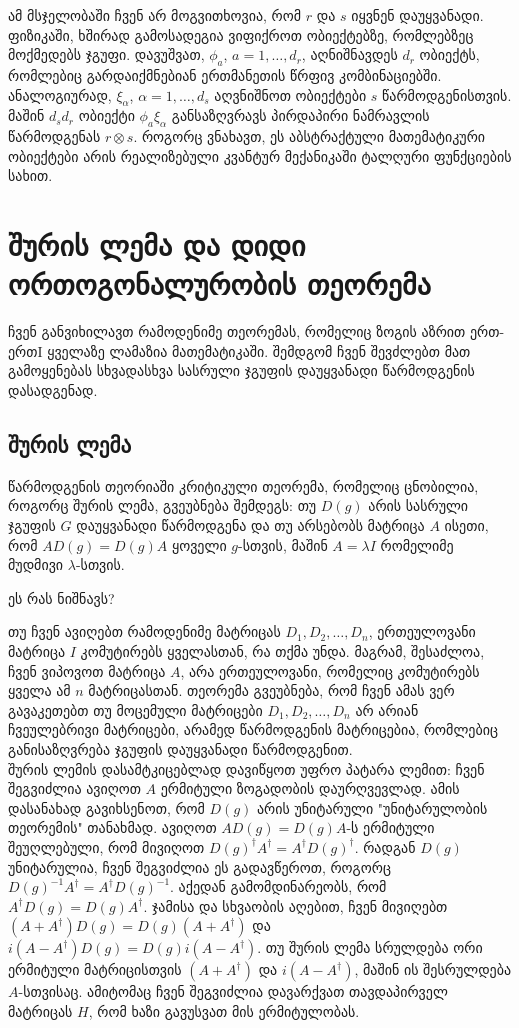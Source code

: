 \documentclass[12pt]{article}
\begin{document}
\begin{sloppypar}
ამ მსჯელობაში ჩვენ არ მოგვითხოვია, რომ $r$ და $s$ იყვნენ დაუყვანადი.\\

ფიზიკაში, ხშირად გამოსადეგია ვიფიქროთ ობიექტებზე, რომლებზეც მოქმედებს ჯგუფი. დავუშვათ, $\phi_a$, $a = 1,\dots,d_r$, აღნიშნავდეს $d_r$ ობიექტს, რომლებიც გარდაიქმნებიან ერთმანეთის წრფივ კომბინაციებში. ანალოგიურად, $\xi_{\alpha}$, $\alpha = 1,\dots,d_s$ აღვნიშნოთ ობიექტები $s$ წარმოდგენისთვის. მაშინ $d_sd_r$ ობიექტი $\phi_a\xi_{\alpha}$ განსაზღვრავს პირდაპირი ნამრავლის წარმოდგენას $r \otimes s$. როგორც ვნახავთ, ეს აბსტრაქტული მათემატიკური ობიექტები არის რეალიზებული კვანტურ მექანიკაში ტალღური ფუნქციების სახით.


\newpage
\section{შურის ლემა და დიდი ორთოგონალურობის თეორემა}
ჩვენ განვიხილავთ რამოდენიმე თეორემას, რომელიც ზოგის აზრით ერთ-ერთI ყველაზე ლამაზია მათემატიკაში. შემდგომ ჩვენ შევძლებთ მათ გამოყენებას სხვადასხვა სასრული ჯგუფის დაუყვანადი წარმოდგენის დასადგენად.

\subsection{შურის ლემა}

წარმოდგენის თეორიაში კრიტიკული თეორემა, რომელიც ცნობილია, როგორც შურის ლემა, გვეუბნება შემდეგს:
თუ $D(g)$ არის სასრული ჯგუფის $G$ დაუყვანადი წარმოდგენა და თუ არსებობს მატრიცა $A$ ისეთი, რომ $AD(g)=D(g)A$ ყოველი $g$-სთვის, მაშინ $A=\lambda I$ რომელიმე მუდმივი $\lambda$-სთვის.

ეს რას ნიშნავს?

თუ ჩვენ ავიღებთ რამოდენიმე მატრიცას $D_1, D_2, \dots, D_n$, ერთეულოვანი მატრიცა $I$ კომუტირებს ყველასთან, რა თქმა უნდა. მაგრამ, შესაძლოა, ჩვენ ვიპოვოთ მატრიცა $A$, არა ერთეულოვანი, რომელიც კომუტირებს ყველა ამ $n$ მატრიცასთან. თეორემა გვეუბნება, რომ ჩვენ ამას ვერ გავაკეთებთ თუ მოცემული მატრიცები $D_1, D_2, \dots, D_n$ არ არიან ჩვეულებრივი მატრიცები, არამედ წარმოდგენის მატრიცებია, რომლებიც განისაზღვრება ჯგუფის დაუყვანადი წარმოდგენით.\\

შურის ლემის დასამტკიცებლად დავიწყოთ უფრო პატარა ლემით: ჩვენ შეგვიძლია ავიღოთ $A$ ერმიტული ზოგადობის დაურღვევლად.
ამის დასანახად გავიხსენოთ, რომ $D(g)$ არის უნიტარული "უნიტარულობის თეორემის" თანახმად. ავიღოთ $AD(g)=D(g)A$-ს ერმიტული შეუღლებული, რომ მივიღოთ $D(g)^{\dagger}A^{\dagger}=A^{\dagger}D(g)^{\dagger}$. რადგან $D(g)$ უნიტარულია, ჩვენ შეგვიძლია ეს გადავწეროთ, როგორც $D(g)^{-1}A^{\dagger}=A^{\dagger}D(g)^{-1}$. აქედან გამომდინარეობს, რომ $A^{\dagger}D(g)=D(g)A^{\dagger}$. ჯამისა და სხვაობის აღებით, ჩვენ მივიღებთ $(A + A^{\dagger})D(g)=D(g)(A + A^{\dagger})$ და $i(A - A^{\dagger})D(g)=D(g)i(A - A^{\dagger})$. თუ შურის ლემა სრულდება ორი ერმიტული მატრიცისთვის $(A + A^{\dagger})$ და $i(A - A^{\dagger})$, მაშინ ის შესრულდება $A$-სთვისაც. ამიტომაც ჩვენ შეგვიძლია დავარქვათ თავდაპირველ მატრიცას $H$, რომ ხაზი გავუსვათ მის ერმიტულობას.


\end{sloppypar}
\end{document}
